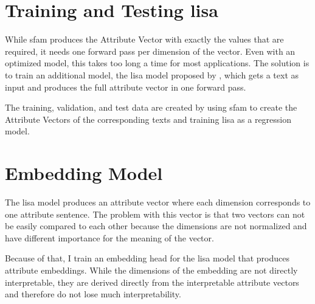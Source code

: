 \section{Training and Testing \acs{lisa}}
\label{sec:approach:lisa}
While \ac{sfam} produces the Attribute Vector with exactly the values that are required, it needs one forward pass per dimension of the vector. Even with an optimized model, this takes too long a time for most applications. The solution is to train an additional model, the \acf{lisa} model proposed by \citet{patelLearningInterpretableStyle2023}, which gets a text as input and produces the full attribute vector in one forward pass.

The training, validation, and test data are created by using \ac{sfam} to create the Attribute Vectors of the corresponding texts and training \ac{lisa} as a regression model.


\section{Embedding Model}
\label{sec:approach:embedding}
The \ac{lisa} model produces an attribute vector where each dimension corresponds to one attribute sentence. The problem with this vector is that two vectors can not be easily compared to each other because the dimensions are not normalized and have different importance for the meaning of the vector.

Because of that, I train an embedding head for the \ac{lisa} model that produces attribute embeddings. While the dimensions of the embedding are not directly interpretable, they are derived directly from the interpretable attribute vectors and therefore do not lose much interpretability.

